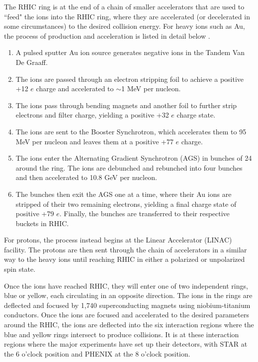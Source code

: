 The RHIC ring is at the end of a chain of smaller accelerators that are used to ``feed" the ions into the RHIC ring, where they are accelerated (or decelerated in some circumstances) to the desired collision energy. For heavy ions such as Au, the process of production and acceleration is listed in detail below \cite{ROSER200223}.
\begin{enumerate}
  \item{} A pulsed sputter Au ion source generates negative ions in the Tandem Van De Graaff.
  \item{} The ions are passed through an electron stripping foil to achieve a positive +12 $e$ charge and accelerated to $\sim$1 MeV per nucleon.
  \item{} The ions pass through bending magnets and another foil to further strip electrons and filter charge, yielding a positive +32 $e$ charge state.
  \item{} The ions are sent to the Booster Synchrotron, which accelerates them to 95 MeV per nucleon and leaves them at a positive +77 $e$ charge.
  \item{} The ions enter the Alternating Gradient Synchrotron (AGS) in bunches of 24 around the ring. The ions are debunched and rebunched into four bunches and then accelerated to 10.8 GeV per nucleon.
  \item{}  The bunches then exit the AGS one at a time, where their Au ions are stripped of their two remaining electrons, yielding a final charge state of positive +79 $e$. Finally, the bunches are transferred to their respective buckets in RHIC. 
\end{enumerate}

For protons, the process instead begins at the Linear Accelerator (LINAC) facility. The protons are then sent through the chain of accelerators in a similar way to the heavy ions until reaching RHIC in either a polarized or unpolarized spin state. 

Once the ions have reached RHIC, they will enter one of two independent rings, blue or yellow, each circulating in an opposite direction. The ions in the rings are deflected and focused by 1,740 superconducting magnets using niobium-titanium conductors. Once the ions are focused and accelerated to the desired parameters around the RHIC, the ions are deflected into the six interaction regions where the blue and yellow rings intersect to produce collisions. It is at these interaction regions where the major experiments have set up their detectors, with STAR at the 6 o'clock position and PHENIX at the 8 o'clock position.

